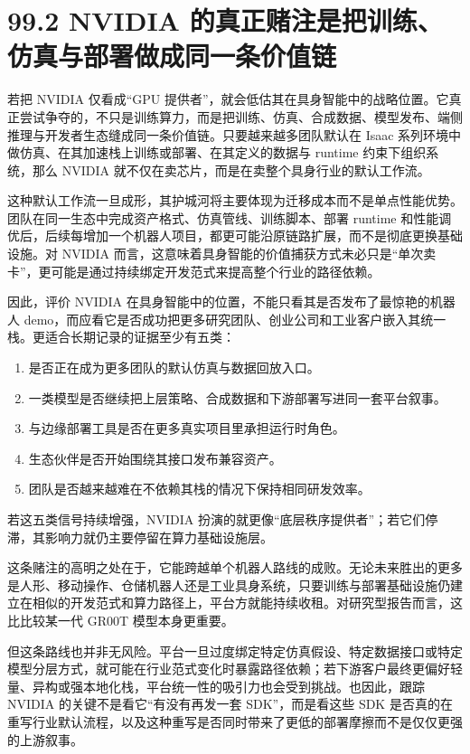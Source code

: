 \section*{99.2 NVIDIA 的真正赌注是把训练、仿真与部署做成同一条价值链}


若把 NVIDIA 仅看成“GPU 提供者”，就会低估其在具身智能中的战略位置。它真正尝试争夺的，不只是训练算力，而是把训练、仿真、合成数据、模型发布、端侧推理与开发者生态缝成同一条价值链。只要越来越多团队默认在 Isaac 系列环境中做仿真、在其加速栈上训练或部署、在其定义的数据与 runtime 约束下组织系统，那么 NVIDIA 就不仅在卖芯片，而是在卖整个具身行业的默认工作流。

这种默认工作流一旦成形，其护城河将主要体现为迁移成本而不是单点性能优势。团队在同一生态中完成资产格式、仿真管线、训练脚本、部署 runtime 和性能调优后，后续每增加一个机器人项目，都更可能沿原链路扩展，而不是彻底更换基础设施。对 NVIDIA 而言，这意味着具身智能的价值捕获方式未必只是“单次卖卡”，更可能是通过持续绑定开发范式来提高整个行业的路径依赖。

因此，评价 NVIDIA 在具身智能中的位置，不能只看其是否发布了最惊艳的机器人 demo，而应看它是否成功把更多研究团队、创业公司和工业客户嵌入其统一栈。更适合长期记录的证据至少有五类：

\begin{enumerate}
\item {} 是否正在成为更多团队的默认仿真与数据回放入口。
\item \texttt{} 一类模型是否继续把上层策略、合成数据和下游部署写进同一套平台叙事。
\item \texttt{} 与边缘部署工具是否在更多真实项目里承担运行时角色。
\item 生态伙伴是否开始围绕其接口发布兼容资产。
\item 团队是否越来越难在不依赖其栈的情况下保持相同研发效率。
\end{enumerate}

若这五类信号持续增强，NVIDIA 扮演的就更像“底层秩序提供者”；若它们停滞，其影响力就仍主要停留在算力基础设施层。

这条赌注的高明之处在于，它能跨越单个机器人路线的成败。无论未来胜出的更多是人形、移动操作、仓储机器人还是工业具身系统，只要训练与部署基础设施仍建立在相似的开发范式和算力路径上，平台方就能持续收租。对研究型报告而言，这比比较某一代 GR00T 模型本身更重要。

但这条路线也并非无风险。平台一旦过度绑定特定仿真假设、特定数据接口或特定模型分层方式，就可能在行业范式变化时暴露路径依赖；若下游客户最终更偏好轻量、异构或强本地化栈，平台统一性的吸引力也会受到挑战。也因此，跟踪 NVIDIA 的关键不是看它“有没有再发一套 SDK”，而是看这些 SDK 是否真的在重写行业默认流程，以及这种重写是否同时带来了更低的部署摩擦而不是仅仅更强的上游叙事。

